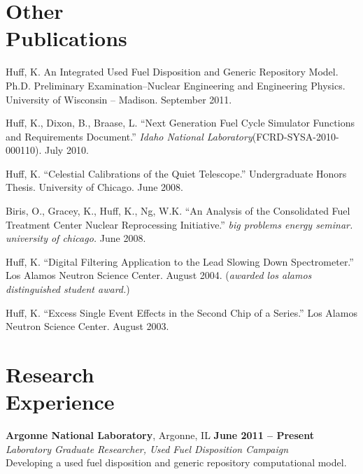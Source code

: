 \documentclass[margin,line]{resume}
\begin{document}
\begin{resume}
    \section{\mysidestyle Other\\Publications}
    \begin{bibenum}
      \item Huff, K. An Integrated Used Fuel Disposition and Generic Repository Model. 
        Ph.D. Preliminary Examination--Nuclear Engineering and Engineering 
        Physics. University of Wisconsin -- Madison.  September 2011. 
      \item Huff, K., Dixon, B., Braase, L. ``Next Generation Fuel Cycle Simulator Functions and Requirements Document.'' 
        \emph{Idaho National Laboratory}(FCRD-SYSA-2010-000110). July 2010. 
      \pagebreak 
      \item Huff, K. ``Celestial Calibrations of the Quiet Telescope.''
        Undergraduate Honors Thesis. University of Chicago. June 2008.
      \item Biris, O., Gracey, K., Huff, K., Ng, W.K.  
        ``An Analysis of the Consolidated Fuel Treatment Center Nuclear 
        Reprocessing Initiative.''
        \emph{big problems energy seminar. university of chicago.} June 2008.
      \item Huff, K. ``Digital Filtering Application to the Lead Slowing Down 
        Spectrometer.'' Los Alamos Neutron Science Center. August 2004.  %
        (\emph{awarded los alamos distinguished student award.}) 
      \item Huff, K. ``Excess Single Event Effects in the Second Chip of a Series.'' 
        Los Alamos Neutron Science Center. August 2003. 
    \end{bibenum}

    \section{\mysidestyle Research\\Experience}
    \textbf{Argonne National Laboratory}, Argonne, IL \hfill \textbf{June 2011 -- Present}\\
		\textsl{Laboratory Graduate Researcher, Used Fuel Disposition Campaign}\\ 
		Developing a used fuel disposition and generic repository computational model.


\end{resume}
\end{document}
